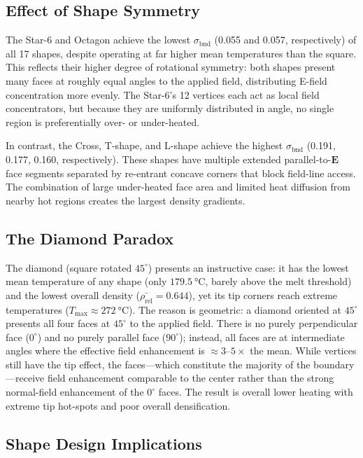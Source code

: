 \documentclass[5p,times]{elsarticle}
\newcommand{\bndstd}{\sigma_{\mathrm{bnd}}}
\newcommand{\rhorel}{\rho_{\mathrm{rel}}}
\newcommand{\vect}[1]{\boldsymbol{#1}}
\begin{document}
\subsection{Effect of Shape Symmetry}

The Star-6 and Octagon achieve the lowest $\bndstd$ (0.055 and 0.057,
respectively) of all 17 shapes, despite operating at far higher mean
temperatures than the square.  This reflects their higher degree of
rotational symmetry: both shapes present many faces at roughly equal
angles to the applied field, distributing E-field concentration more
evenly.  The Star-6's 12 vertices each act as local field concentrators,
but because they are uniformly distributed in angle, no single region
is preferentially over- or under-heated.

In contrast, the Cross, T-shape, and L-shape achieve the highest
$\bndstd$ (0.191, 0.177, 0.160, respectively).  These shapes have
multiple extended parallel-to-$\vect{E}$ face segments separated by
re-entrant concave corners that block field-line access.  The
combination of large under-heated face area and limited heat diffusion
from nearby hot regions creates the largest density gradients.

\subsection{The Diamond Paradox}

The diamond (square rotated $45^\circ$) presents an instructive
case: it has the lowest mean temperature of any shape (only
$\SI{179.5}{\celsius}$, barely above the melt threshold) and the
lowest overall density ($\bar{\rhorel} = 0.644$), yet its tip corners
reach extreme temperatures ($T_{\max} \approx \SI{272}{\celsius}$).
The reason is geometric: a diamond oriented at $45^\circ$ presents
all four faces at $45^\circ$ to the applied field.  There is no
purely perpendicular face ($0^\circ$) and no purely parallel face
($90^\circ$); instead, all faces are at intermediate angles where the
effective field enhancement is $\approx 3$--$5\times$ the mean.  While
vertices still have the tip effect, the faces---which constitute the
majority of the boundary---receive field enhancement comparable to the
center rather than the strong normal-field enhancement of the $0^\circ$
faces.  The result is overall lower heating with extreme tip hot-spots
and poor overall densification.

\subsection{Shape Design Implications}
\end{document}
